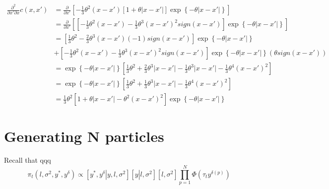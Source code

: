 \documentclass{sfuthesis}
\begin{document}
\begin{align}
\frac{{{\partial ^2}}}{{\partial x'\partial x}}c\left( {x,x'} \right) &= \frac{\partial }{{\partial x'}}\left[ { - \frac{1}{3}{\theta ^2}\left( {x - x'} \right)\left[ {1 + \theta \left| {x - x'} \right|} \right]\exp \left\{ { - \theta \left| {x - x'} \right|} \right\}} \right]\\
 &= \frac{\partial }{{\partial x'}}\left[ {\left[ { - \frac{1}{3}{\theta ^2}\left( {x - x'} \right) - \frac{1}{3}{\theta ^3}{{\left( {x - x'} \right)}^2}sign\left( {x - x'} \right)} \right]\exp \left\{ { - \theta \left| {x - x'} \right|} \right\}} \right]\\
 &= \left[ {\frac{1}{3}{\theta ^2} - \frac{2}{3}{\theta ^3}\left( {x - x'} \right)\left( { - 1} \right)sign\left( {x - x'} \right)} \right]\exp \left\{ { - \theta \left| {x - x'} \right|} \right\}\\
 &+ \left[ { - \frac{1}{3}{\theta ^2}\left( {x - x'} \right) - \frac{1}{3}{\theta ^3}{{\left( {x - x'} \right)}^2}sign\left( {x - x'} \right)} \right]\exp \left\{ { - \theta \left| {x - x'} \right|} \right\}\left( {\theta sign\left( {x - x'} \right)} \right)\\
 &= \exp \left\{ { - \theta \left| {x - x'} \right|} \right\}\left[ {\frac{1}{3}{\theta ^2} + \frac{2}{3}{\theta ^3}\left| {x - x'} \right| - \frac{1}{3}{\theta ^3}\left| {x - x'} \right| - \frac{1}{3}{\theta ^4}{{\left( {x - x'} \right)}^2}} \right]\\
 &= \exp \left\{ { - \theta \left| {x - x'} \right|} \right\}\left[ {\frac{1}{3}{\theta ^2} + \frac{1}{3}{\theta ^3}\left| {x - x'} \right| - \frac{1}{3}{\theta ^4}{{\left( {x - x'} \right)}^2}} \right]\\
 &= \frac{1}{3}{\theta ^2}\left[ {1 + \theta \left| {x - x'} \right| - {\theta ^2}{{\left( {x - x'} \right)}^2}} \right]\exp \left\{ { - \theta \left| {x - x'} \right|} \right\}
\end{align}




\section{Generating N particles}

Recall that qqq
\begin{equation}
  {\pi _t}\left( {l,{\sigma ^2},{y^*},{y^\delta }} \right) \propto \left[ {{y^*},{y^\delta }\left| {y,l,{\sigma ^2}} \right.} \right]\left[ {y\left| {l,{\sigma ^2}} \right.} \right]\left[ {l,{\sigma ^2}} \right]\prod\limits_{p = 1}^N {\Phi \left( {{\tau _t}{y^{\delta \left( p \right)}}} \right)} 
\end{equation}
\end{document}

